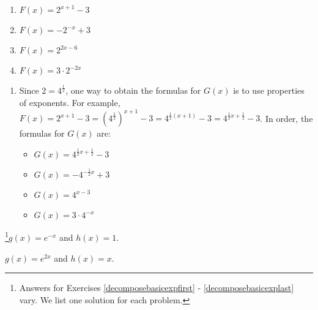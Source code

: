 \documentclass{ximera}
\begin{document}
\begin{multicols}{4}
\begin{enumerate}
\setcounter{enumi}{\value{HW}}

\item $F(x) = 2^{x+1}-3$

\item  $F(x) = -2^{-x} + 3$

\item $F(x) = 2^{2x-6}$

\item  $F(x) =3 \cdot 2^{-2x}$

\setcounter{HW}{\value{enumi}}
\end{enumerate}
\end{multicols}

\begin{enumerate}
\setcounter{enumi}{\value{HW}}

\item  Since $2 = 4^{\frac{1}{2}}$, one way to obtain the formulas for $G(x)$ is to use properties of exponents.  For example, $F(x) = 2^{x+1}-3 = \left(4^{\frac{1}{2}}\right)^{x+1} -3 = 4^{\frac{1}{2}(x+1)} - 3 = 4^{\frac{1}{2} x + \frac{1}{2}} - 3$.  In order, the formulas for $G(x)$ are:

\begin{multicols}{4}
\begin{itemize}

\item $G(x) = 4^{\frac{1}{2}x+\frac{1}{2}}-3$

\item  $G(x) = -4^{-\frac{1}{2} x} + 3$

\item $G(x) = 4^{x-3}$

\item  $G(x) =3 \cdot 4^{-x}$

\end{itemize}
\end{multicols}

\setcounter{HW}{\value{enumi}}
\end{enumerate}

\begin{enumerate}
\setcounter{enumi}{\value{HW}}

\addtocounter{enumi}{1}

\begin{multicols}{2}

\item\footnote{Answers for Exercises \ref{decomposebasicexpfirst} - \ref{decomposebasicexplast} vary.  We list one solution for each problem.}$g(x)  = e^{-x}$ and $h(x) = 1$.
\item $g(x) = e^{2x}$ and $h(x) = x$.

\end{multicols}

\setcounter{HW}{\value{enumi}}
\end{enumerate}
\end{document}
